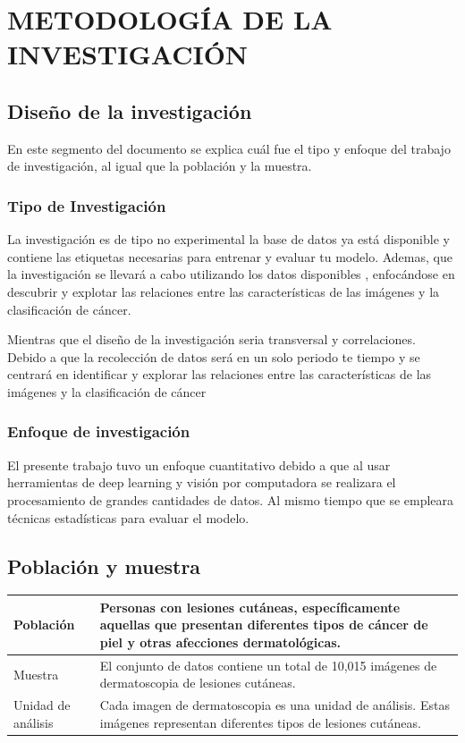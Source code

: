 \chapter{METODOLOGÍA DE LA INVESTIGACIÓN}

\section{Diseño de la investigación}
En este segmento del documento se explica cuál fue el tipo y enfoque del trabajo de investigación, al igual que la población y la muestra.


\subsection{Tipo de Investigación}
La investigación es de tipo no experimental la base de datos ya está disponible y contiene las etiquetas necesarias para entrenar y evaluar tu modelo. Ademas, que la investigación se llevará a cabo utilizando los datos disponibles , enfocándose en descubrir y explotar las relaciones entre las características de las imágenes y la clasificación de cáncer.

Mientras que el diseño de la investigación seria transversal y correlaciones. Debido a que la recolección de datos será en un solo periodo te tiempo y se centrará en identificar y explorar las relaciones entre las características de las imágenes y la clasificación de cáncer




\subsection{Enfoque de investigación}
El presente trabajo tuvo un enfoque cuantitativo debido a que al usar herramientas de deep learning y visión por computadora se realizara el procesamiento de grandes cantidades de datos. Al mismo tiempo que se empleara técnicas estadísticas para evaluar el modelo.



\section{Población y muestra}

\begin{center}
	\begin{tabular}{|p{4cm}|p{8cm}|}
		\hline
		Población & Personas con lesiones cutáneas, específicamente aquellas que presentan diferentes tipos de cáncer de piel y otras afecciones dermatológicas.  \\
		\hline
		Muestra & El conjunto de datos contiene un total de 10,015 imágenes de dermatoscopia de lesiones cutáneas. \\
		\hline
		Unidad de análisis & Cada imagen de dermatoscopia es una unidad de análisis. Estas imágenes representan diferentes tipos de lesiones cutáneas.  \\
		\hline
	\end{tabular}
\end{center}



